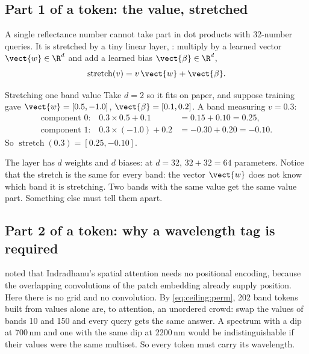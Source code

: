 \subsection{Part 1 of a token: the value, stretched}

A single reflectance number cannot take part in dot products with 32-number queries. It is stretched by a tiny linear layer, : multiply by a learned vector $\vect{w}\in\R^{d}$ and add a learned bias $\vect{\beta}\in\R^{d}$,
\begin{equation}\label{eq:ceiling:stretch}
  \operatorname{stretch}(v) = v\,\vect{w} + \vect{\beta}.
\end{equation}

\begin{worked}[label={we:ceiling:stretch}]{Stretching one band value}
Take $d = 2$ so it fits on paper, and suppose training gave $\vect{w} = [0.5, -1.0]$, $\vect{\beta} = [0.1, 0.2]$. A band measuring $v = 0.3$:
\begin{align*}
  \text{component 0:}\quad 0.3\times0.5 + 0.1 &= 0.15 + 0.10 = 0.25,\\
  \text{component 1:}\quad 0.3\times(-1.0) + 0.2 &= -0.30 + 0.20 = -0.10.
\end{align*}
So $\operatorname{stretch}(0.3) = [0.25, -0.10]$.
\end{worked}

The layer has $d$ weights and $d$ biases: at $d = 32$, $32 + 32 = 64$ parameters. Notice that the stretch is the same for every band: the vector $\vect{w}$ does not know which band it is stretching. Two bands with the same value get the same value part. Something else must tell them apart.

\subsection{Part 2 of a token: why a wavelength tag is required}

 noted that Indradhanu's spatial attention needs no positional encoding, because the overlapping convolutions of the patch embedding already supply position. Here there is no grid and no convolution. By \cref{eq:ceiling:perm}, 202 band tokens built from values alone are, to attention, an unordered crowd: swap the values of bands 10 and 150 and every query gets the same answer. A spectrum with a dip at 700\,nm and one with the same dip at 2200\,nm would be indistinguishable if their values were the same multiset. So every token must carry its wavelength.

